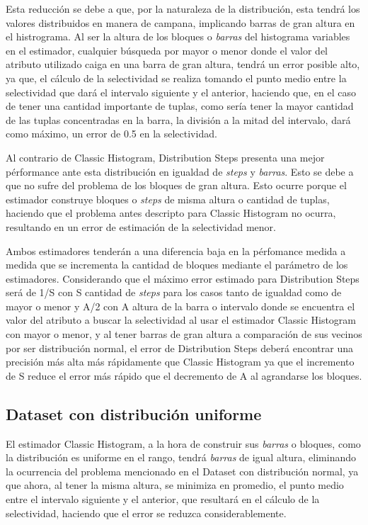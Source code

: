 \documentclass[a4paper, 10pt, twoside]{article}
\begin{document}
Esta reducción se debe a que, por la naturaleza de la distribución, esta tendrá los valores distribuidos en manera de campana, implicando 
barras de gran altura en el histrograma. Al ser la altura de los bloques o \textit{barras} del histograma variables en el estimador, 
cualquier búsqueda por mayor o menor donde el valor del atributo utilizado caiga en una barra de gran altura, 
tendrá un error posible alto, ya que, el cálculo de la selectividad se realiza tomando el punto medio entre la selectividad que dará el 
intervalo siguiente y el anterior, haciendo que, en el caso de tener una cantidad importante de tuplas, como sería tener la mayor cantidad de las tuplas concentradas en la barra, la división a la mitad del intervalo, dará como máximo, un error de 0.5 en la selectividad.

Al contrario de Classic Histogram, Distribution Steps presenta una mejor pérformance ante esta distribución en igualdad de \textit{steps} y \textit{barras}. Esto se debe a que no sufre del problema de los bloques de gran altura. Esto ocurre porque el estimador construye bloques o \textit{steps} de misma altura o cantidad de tuplas, haciendo que el problema antes descripto para Classic Histogram no ocurra, resultando en un error de estimación de la selectividad menor.

Ambos estimadores tenderán a una diferencia baja en la pérfomance medida a medida que se incrementa la cantidad de bloques mediante el parámetro de los estimadores. Considerando que el máximo error estimado para Distribution Steps será de 1/S con S cantidad de \textit{steps} para los casos tanto de igualdad como de mayor o menor y A/2 con A altura de la barra o intervalo donde se encuentra el valor del atributo a buscar la selectividad al usar el estimador Classic Histogram con mayor o menor, y al tener barras de gran altura a comparación de sus vecinos por ser distribución normal, el error de Distribution Steps deberá encontrar una precisión más alta más rápidamente que Classic Histogram ya que el incremento de S reduce el error más rápido que el decremento de A al agrandarse los bloques.

\subsection{Dataset con distribución uniforme}
El estimador Classic Histogram, a la hora de construir sus \textit{barras} o bloques, como la distribución es uniforme en el rango, tendrá \textit{barras} de igual altura, eliminando la ocurrencia del problema mencionado en el Dataset con distribución normal, ya que ahora, al tener la misma altura, se minimiza en promedio, el punto medio entre el intervalo siguiente y el anterior, que resultará en el cálculo de la selectividad, haciendo que el error se reduzca considerablemente.
\end{document}
